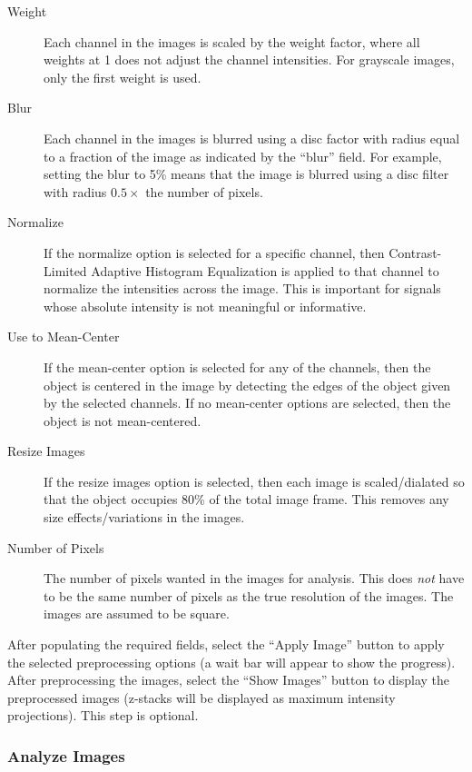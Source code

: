 \documentclass[12pt]{article}
\begin{document}
\begin{description}
\item[Weight] Each channel in the images is scaled by the weight factor, where all weights at 1 does not adjust the channel intensities. For grayscale images, only the first weight is used. 
%
\item[Blur] Each channel in the images is blurred using a disc factor with radius equal to a fraction of the image as indicated by the ``blur'' field. For example, setting the blur to 5\% means that the image is blurred using a disc filter with radius $0.5 \times$ the number of pixels. 
%
\item[Normalize] If the normalize option is selected for a specific channel, then Contrast-Limited Adaptive Histogram Equalization is applied to that channel to normalize the intensities across the image. This is important for signals whose absolute intensity is not meaningful or informative. 
%
\item[Use to Mean-Center] If the mean-center option is selected for any of the channels, then the object is centered in the image by detecting the edges of the object given by the selected channels. If no mean-center options are selected, then the object is not mean-centered.
%
\item[Resize Images] If the resize images option is selected, then each image is scaled/dialated so that the object occupies 80\% of the total image frame. This removes any size effects/variations in the images. 
%
\item[Number of Pixels] The number of pixels wanted in the images for analysis. This does {\em not} have to be the same number of pixels as the true resolution of the images. The images are assumed to be square. 
%
\end{description}

After populating the required fields, select the ``Apply Image'' button to apply the selected preprocessing options (a wait bar will appear to show the progress).
%
After preprocessing the images, select the ``Show Images'' button to display the preprocessed images (z-stacks will be displayed as maximum intensity projections). This step is optional.

\subsubsection{Analyze Images}
\end{document}
